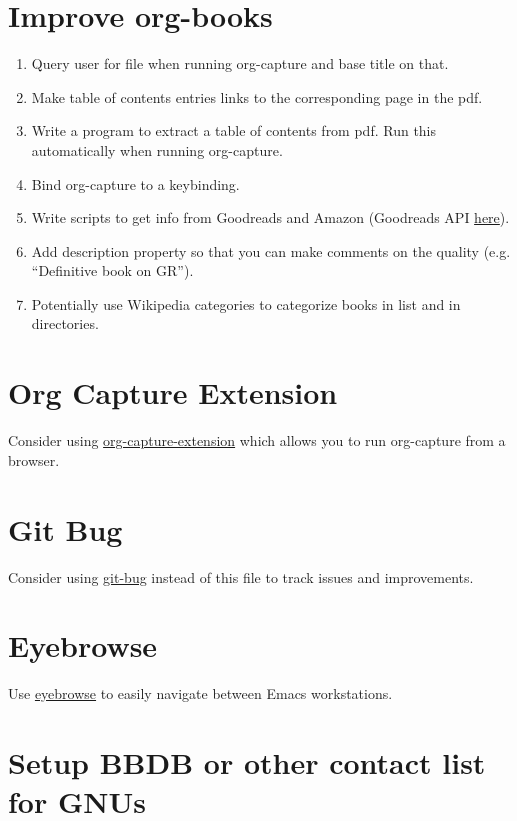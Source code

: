 \documentclass{default}
\begin{document}
\section{Improve org-books}

\begin{enumerate}
\item Query user for file when running org-capture and base title on that.
\item Make table of contents entries links to the corresponding page in the pdf.
\item Write a program to extract a table of contents from pdf. Run this automatically when running
  org-capture.
\item Bind org-capture to a keybinding.
\item Write scripts to get info from Goodreads and Amazon (Goodreads API
  \href{https://www.goodreads.com/api}{here}).
\item Add description property so that you can make comments on the quality (e.g. ``Definitive book
  on GR'').
\item Potentially use Wikipedia categories to categorize books in list and in directories.
\end{enumerate}

\section{Org Capture Extension}

Consider using \href{https://github.com/sprig/org-capture-extension}{org-capture-extension} which
allows you to run org-capture from a browser.

\section{Git Bug}

Consider using \href{https://github.com/MichaelMure/git-bug}{git-bug} instead of this file to track
issues and improvements.

\section{Eyebrowse}

Use \href{https://github.com/wasamasa/eyebrowse}{eyebrowse} to easily navigate between Emacs workstations.

\section{Setup BBDB or other contact list for GNUs}
\end{document}
